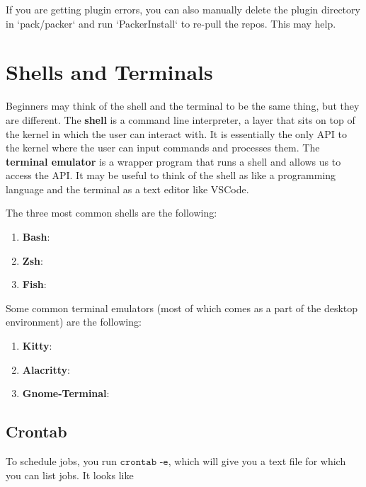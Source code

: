 \documentclass{article}
\begin{document}
    If you are getting plugin errors, you can also manually delete the plugin directory in `pack/packer` and run `PackerInstall` to re-pull the repos. This may help. 

\section{Shells and Terminals}

  Beginners may think of the shell and the terminal to be the same thing, but they are different. The \textbf{shell} is a command line interpreter, a layer that sits on top of the kernel in which the user can interact with. It is essentially the only API to the kernel where the user can input commands and processes them. The \textbf{terminal emulator} is a wrapper program that runs a shell and allows us to access the API. It may be useful to think of the shell as like a programming language and the terminal as a text editor like VSCode. 

  The three most common shells are the following: 
  \begin{enumerate}
    \item \textbf{Bash}: 
    \item \textbf{Zsh}: 
    \item \textbf{Fish}:  
  \end{enumerate}

  Some common terminal emulators (most of which comes as a part of the desktop environment) are the following: 
  \begin{enumerate}
    \item \textbf{Kitty}: 
    \item \textbf{Alacritty}: 
    \item \textbf{Gnome-Terminal}: 
  \end{enumerate}

  \subsection{Crontab}

    To schedule jobs, you run $\texttt{crontab -e}$, which will give you a text file for which you can list jobs. It looks like  
\end{document}

